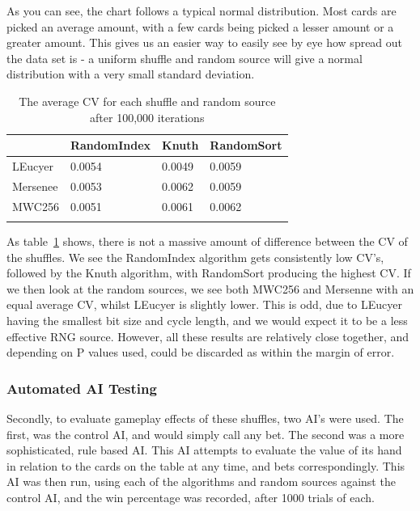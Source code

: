 As you can see, the chart follows a typical normal distribution. Most cards are
picked an average amount, with a few cards being picked a lesser amount or
a greater amount. This gives us an easier way to easily see by eye how spread
out the data set is - a uniform shuffle and random source will give a normal
distribution with a very small standard deviation.

\begin{table}[H]
    \begin{adjustbox}{center}
    \begin{tabular}{l l l l}
    \toprule
                & RandomIndex   & Knuth & RandomSort  \\
    \midrule
    LEucyer     & 0.0054        & 0.0049& 0.0059      \\ \addlinespace
    Mersenee    & 0.0053        & 0.0062& 0.0059      \\ \addlinespace
    MWC256      & 0.0051        & 0.0061& 0.0062      \\ \addlinespace
    \bottomrule
    \end{tabular}
    \end{adjustbox}
    \caption{The average CV for each shuffle and random source after 100,000
             iterations}
    \label{table:cv}
\end{table}

As table~\ref{table:cv} shows, there is not a massive amount of difference between
the CV of the shuffles. We see the RandomIndex algorithm gets consistently low
CV's, followed by the Knuth algorithm, with RandomSort producing the highest
CV\@. If we then look at the random sources, we see both MWC256 and Mersenne
with an equal average CV, whilst LEucyer is slightly lower. This is odd, due
to LEucyer having the smallest bit size and cycle length, and we would expect
it to be a less effective RNG source. However, all these results are relatively
close together, and depending on P values used, could be discarded as within
the margin of error.

\subsubsection{Automated AI Testing}\label{automatedaitesting}

Secondly, to evaluate gameplay effects of these shuffles, two AI's were used.
The first, was the control AI, and would simply call any bet. The second
was a more sophisticated, rule based AI\@. This AI attempts to evaluate the value
of its hand in relation to the cards on the table at any time, and bets
correspondingly. This AI was then run, using each of the algorithms and
random sources against the control AI, and the win percentage was recorded,
after 1000 trials of each.


